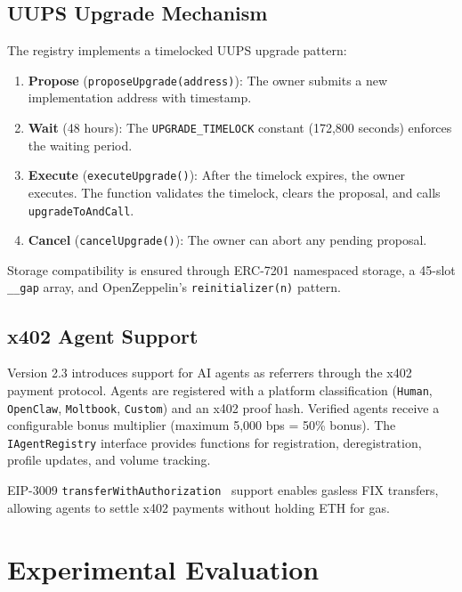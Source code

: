 \documentclass[conference]{IEEEtran}
\begin{document}
\subsection{UUPS Upgrade Mechanism}

The registry implements a timelocked UUPS upgrade pattern:

\begin{enumerate}
    \item \textbf{Propose} (\texttt{proposeUpgrade(address)}): The owner submits a new implementation address with timestamp.
    \item \textbf{Wait} (48 hours): The \texttt{UPGRADE\_TIMELOCK} constant (172,800 seconds) enforces the waiting period.
    \item \textbf{Execute} (\texttt{executeUpgrade()}): After the timelock expires, the owner executes. The function validates the timelock, clears the proposal, and calls \texttt{upgradeToAndCall}.
    \item \textbf{Cancel} (\texttt{cancelUpgrade()}): The owner can abort any pending proposal.
\end{enumerate}

Storage compatibility is ensured through ERC-7201 namespaced storage, a 45-slot \texttt{\_\_gap} array, and OpenZeppelin's \texttt{reinitializer(n)} pattern.

\subsection{x402 Agent Support}
\label{sec:impl:x402}

Version 2.3 introduces support for AI agents as referrers through the x402 payment protocol. Agents are registered with a platform classification (\texttt{Human}, \texttt{OpenClaw}, \texttt{Moltbook}, \texttt{Custom}) and an x402 proof hash. Verified agents receive a configurable bonus multiplier (maximum 5,000 bps = 50\% bonus). The \texttt{IAgentRegistry} interface provides functions for registration, deregistration, profile updates, and volume tracking.

EIP-3009 \texttt{transfer\-With\-Authorization}~\cite{eip3009} support enables gasless FIX transfers, allowing agents to settle x402 payments without holding ETH for gas.

\section{Experimental Evaluation}
\label{sec:eval}
\end{document}
